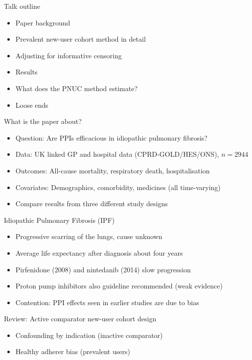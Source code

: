 \documentclass[aspectratio=169,12pt]{beamer} %
\begin{document}

\begin{frame}{Talk outline}
    \begin{itemize}
	\item Paper background
	\item Prevalent new-user cohort method in detail
	\item Adjusting for informative censoring
	\item Results
	\item What does the PNUC method estimate?
	\item Loose ends
    \end{itemize}
\end{frame}

\begin{frame}{What is the paper about?}
    \begin{itemize}
	\item Question: Are PPIs efficacious in idiopathic pulmonary fibrosis?
	\item Data: UK linked GP and hospital data (CPRD-GOLD/HES/ONS), $n=2944$
	\item Outcomes: All-cause mortality, respiratory death, hospitalisation
	\item Covariates: Demographics, comorbidity, medicines (all time-varying)
	\item Compare results from three different study designs
    \end{itemize}
\end{frame}

\begin{frame}{Idiopathic Pulmonary Fibrosis (IPF)}
    \begin{itemize}
        \item Progressive scarring of the lungs, cause unknown
	\item Average life expectancy after diagnosis about four years
	\item Pirfenidone (2008) and nintedanib (2014) slow progression
	\item Proton pump inhibitors also guideline recommended (weak evidence)
	\item Contention: PPI effects seen in earlier studies are due to bias
    \end{itemize}
\end{frame}

\begin{frame}{Review: Active comparator new-user cohort design}
    \begin{itemize}
	\item Confounding by indication (inactive comparator)
	\item Healthy adherer bias (prevalent users)
    \end{itemize}
\end{frame}
\end{document}
